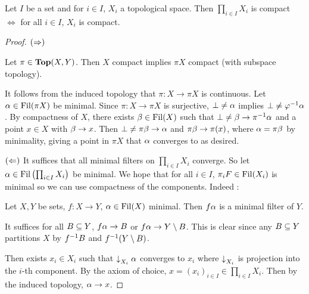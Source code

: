 \documentclass[main.tex]{subfiles}
\begin{document}
\begin{prop} 
  
  Let $I$ be a set and for $i \in I$, $X_i$ a topological space.
  Then $\prod_{i \in I} X_i$ is compact $\iff$
  for all $i \in I$, $X_i$ is compact. 
\end{prop}
\begin{proof}
  $(\Rightarrow)$ 
  \begin{lem}

    Let $\pi \in \mathbf{Top}(X,Y)$.
    Then $X$ compact implies $\pi X$ compact (with subspace topology).
    \begin{proof1}
      It follows from the induced topology that 
      $\pi : X \to \pi X$ is continuous.
      Let $\alpha \in \operatorname{Fil}(\pi X)$ be minimal. 
      Since $\pi : X \to \pi X$ is surjective,
      $\bot \neq \alpha$ implies $\bot \neq \varphi^{-1} \alpha$.
      By compactness of $X$, there exists $\beta \in \operatorname{Fil}(X)$ such that 
      $\bot \neq \beta \to \pi^{-1} \alpha$ and a point $x \in X$ with $\beta \to x$.
      Then $\bot \neq \pi\beta \to \alpha$ and $\pi \beta \to \pi(x)$,
      where $\alpha = \pi\beta$ by minimality, giving a point in $\pi X$
      that $\alpha$ converges to as desired. 
    \end{proof1}
  \end{lem}

  $(\Leftarrow)$ 
  It suffices that all minimal filters on $\prod_{i \in I} X_i$ converge.
  So let $\alpha \in \operatorname{Fil}\left(\prod_{i \in I} X_i\right)$ be minimal.
  We hope that for all $i \in I$, $\pi_i F \in \operatorname{Fil}(X_i)$ is minimal so 
  we can use compactness of the components. 
  Indeed : 
  \begin{lem} 
  
    Let $X,Y$ be sets, $f : X \to Y$, $\alpha \in \operatorname{Fil}(X)$ minimal.
    Then $f \alpha$ is a minimal filter of $Y$. 
  \end{lem}
  \begin{proof1}
    It suffices for all $B \subseteq Y$, $f \alpha \to B$ or $f \alpha \to Y\setminus B$.
    This is clear since any $B \subseteq Y$ partitions $X$ by 
    $f^{-1} B$ and $f^{-1} (Y\setminus B)$.
  \end{proof1}
  Then exists $x_i \in X_i$ such that $\downarrow_{X_i}^{} \alpha$ converges to $x_i$
  where $\downarrow_{X_i}^{}$ is projection into the $i$-th component.
  By the axiom of choice, $x = (x_i)_{i\in I} \in \prod_{i \in I} X_i$.
  Then by the induced topology, $\alpha \to x$.
\end{proof}
\end{document}
